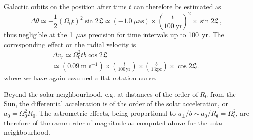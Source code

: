 \documentclass{aa}
\newcommand{\glon}{\mathfrak{L}}
\begin{document}
Galactic orbits on the position after time $t$ can therefore be estimated as
\begin{equation}\label{eq:delta-theta}
\Delta\theta \simeq -\frac{1}{2} \left(\Omega_0 t\right)^2 \sin 2\glon \simeq
(-1.0~\mu\text{as})\times\left(\frac{t}{100~\text{yr}}\right)^2\times\sin 2\glon \, ,
\end{equation}
thus negligible at the 1~$\mu$as precision for time intervals up to 100~yr.
The corresponding effect on the radial velocity is
\begin{multline}
\Delta v_r \simeq \Omega_0^2 t b \cos 2\glon \\
\simeq (0.09~\text{m~s}^{-1})\times\left(\frac{t}{100~\text{yr}}\right)\times
\left(\frac{b}{1~\text{kpc}}\right)\times\cos 2\glon \, ,
\end{multline}
where we have again assumed a flat rotation curve.

Beyond the solar neighbourhood, e.g. at distances of the order of $R_0$ from the Sun, the
differential acceleration is of the order of the solar acceleration, or $a_0=\Omega_0^2R_0$.
The astrometric effects, being proportional to $a_\perp/b\sim a_0/R_0=\Omega_0^2$, are
therefore of the same order of magnitude as computed above for the solar neighbourhood.
\end{document}
